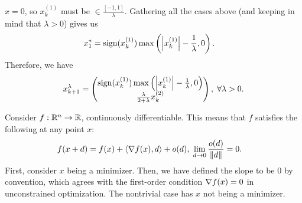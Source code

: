 \documentclass[10pt]{article}
\begin{document}
\begin{Exercise}
		$x = 0$, so $x_k^{(1)}$ must be $\in \frac{[-1, 1]}{\lambda}$. Gathering all the
		cases above (and keeping in mind that $\lambda > 0$) gives us
		\begin{align*}
			x_1^* &= \mathrm{sign}(x_k^{(1)}) \max\left(\left| x_k^{(1)} \right| -
				\frac{1}{\lambda}, 0\right).
		\end{align*}
		Therefore, we have
		\[
			x_{k+1}^{\lambda} = \begin{pmatrix}
				\mathrm{sign}(x_k^{(1)}) \max\left( \left| x_k^{(1)} \right| -
				\frac{1}{\lambda}, 0 \right) \\
				\frac{\lambda}{2 + \lambda} x_k^{(2)}
			\end{pmatrix}, \; \forall \lambda > 0.
		\]
\end{Exercise}

\begin{Exercise}
	\label{ex:p2}
	Consider $f: \mathbb{R}^n \to \mathbb{R}$, continuously differentiable. This means that
	$f$ satisfies the following at any point $x$:
	\begin{align}
		f(x + d) &= f(x) + \left\langle \nabla f(x), d \right\rangle + o(d), \;
		\lim_{d \to 0} \frac{o(d)}{\left \| d \right \|} = 0.
		\label{eq:diff-defn}
	\end{align}
	First, consider $x$ being a minimizer. Then, we have defined the slope to
	be $0$ by convention, which agrees with the first-order condition $\nabla
	f(x) = 0$ in unconstrained optimization. The nontrivial case has $x$ not
	being a minimizer.


\end{Exercise}
\end{document}
